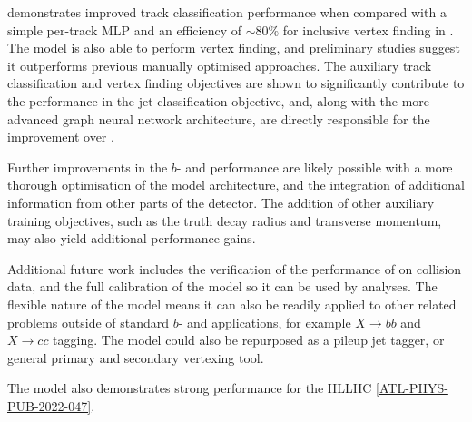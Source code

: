 \GNN demonstrates improved track classification performance when compared with a simple per-track MLP and an efficiency of $\sim80\%$ for inclusive vertex finding in \bjets.
The model is also able to perform vertex finding, and preliminary studies suggest it outperforms previous manually optimised approaches.
The auxiliary track classification and vertex finding objectives are shown to significantly contribute to the performance in the jet classification objective, and, along with the more advanced graph neural network architecture, are directly responsible for the improvement over \DLr.

Further improvements in the $b$- and \ctagging performance are likely possible with a more thorough optimisation of the model architecture, and the integration of additional information from other parts of the \ATLAS detector.
The addition of other auxiliary training objectives, such as the truth \bhadron decay radius and transverse momentum, may also yield additional performance gains.

Additional future work includes the verification of the performance of \GNN on collision data, and the full calibration of the model so it can be used by analyses.
The flexible nature of the model means it can also be readily applied to other related problems outside of standard $b$- and \ctagging applications, for example $X \rightarrow bb$ and $X \rightarrow cc$ tagging.
The model could also be repurposed as a pileup jet tagger, or general primary and secondary vertexing tool.

The model also demonstrates strong performance for the HLLHC \cref{ATL-PHYS-PUB-2022-047}.
